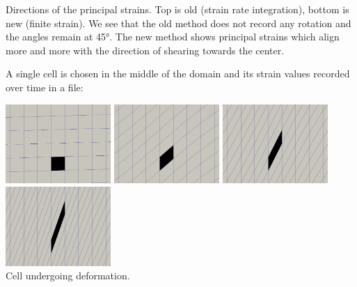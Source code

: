 \begin{center}
{\captionfont Directions of the principal strains. Top is old (strain rate integration), 
bottom is new (finite strain). We see that 
the old method does not record any rotation and the angles remain at 45\si{\degree}. 
The new method shows principal strains which align more and more with the direction 
of shearing towards the center.}
\end{center}


A single cell is chosen in the middle of the domain and its strain values 
recorded over time in a file:
\begin{center}
\includegraphics[width=4cm]{python_codes/fieldstone_89/results/shearband/target0000.png}
\includegraphics[width=4cm]{python_codes/fieldstone_89/results/shearband/target0003.png}
\includegraphics[width=4cm]{python_codes/fieldstone_89/results/shearband/target0007.png}
\includegraphics[width=4cm]{python_codes/fieldstone_89/results/shearband/target0010.png}\\
{\captionfont Cell undergoing deformation.}
\end{center}

